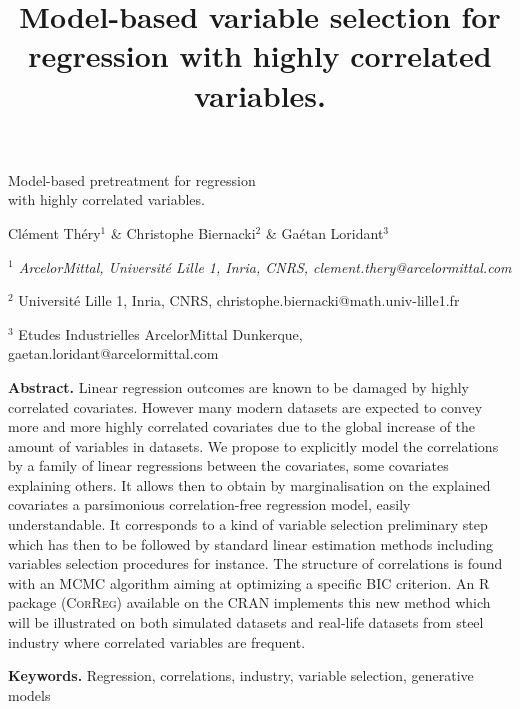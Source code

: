 \documentclass[11pt,a4paper]{article}
\title{Model-based variable selection for regression with highly correlated variables.}
\begin{document}
\begin{center}
{\Large
	{\sc Model-based pretreatment for regression \\ with highly correlated variables.}
}
\bigskip

  Clément Théry$^{1}$ \& Christophe Biernacki$^{2}$ \& Gaétan Loridant$^{3}$
\bigskip

{\it
$^{1}$ ArcelorMittal, Université Lille 1, Inria, CNRS, clement.thery@arcelormittal.com
 
$^{2}$ Université Lille 1, Inria, CNRS, christophe.biernacki@math.univ-lille1.fr

$^{3}$ Etudes Industrielles ArcelorMittal Dunkerque, gaetan.loridant@arcelormittal.com\textbf{}
}
\end{center}
\bigskip

{\bf Abstract.} Linear regression outcomes are known to be damaged by highly correlated covariates. However many modern datasets are expected to convey more and more highly correlated covariates due to the global increase of the amount of variables in datasets. We propose to explicitly model the correlations by a family of linear regressions between the covariates, some covariates explaining others. It allows then to obtain by marginalisation on the explained covariates a parsimonious correlation-free regression model, easily understandable. 
It corresponds to a kind of variable selection preliminary step which has then to be followed by standard linear estimation methods including variables selection procedures for instance. The structure of correlations is found with an MCMC algorithm aiming at optimizing a specific BIC criterion.
 An R package (\textsc{CorReg}) available on the CRAN implements this new method which will be illustrated on both simulated datasets and real-life datasets from steel industry where correlated variables are frequent.
\smallskip

{\bf Keywords.} Regression, correlations, industry, variable selection, generative models
\end{document}

